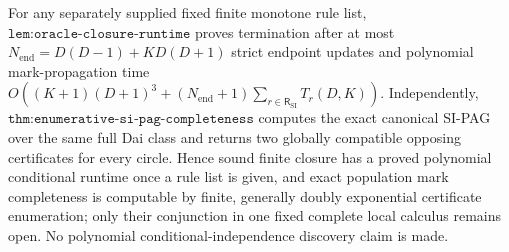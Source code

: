 For any separately supplied fixed finite monotone rule list, \(\texttt{lem:oracle-closure-runtime}\) proves termination after at most \(N_{\mathrm{end}}=D(D-1)+KD(D+1)\) strict endpoint updates and polynomial mark-propagation time \(O\!\left((K+1)(D+1)^3+(N_{\mathrm{end}}+1)\sum_{r\in\mathsf R_{\mathrm{SI}}}T_r(D,K)\right)\). Independently, \(\texttt{thm:enumerative-si-pag-completeness}\) computes the exact canonical SI-PAG over the same full Dai class and returns two globally compatible opposing certificates for every circle. Hence sound finite closure has a proved polynomial conditional runtime once a rule list is given, and exact population mark completeness is computable by finite, generally doubly exponential certificate enumeration; only their conjunction in one fixed complete local calculus remains open. No polynomial conditional-independence discovery claim is made.